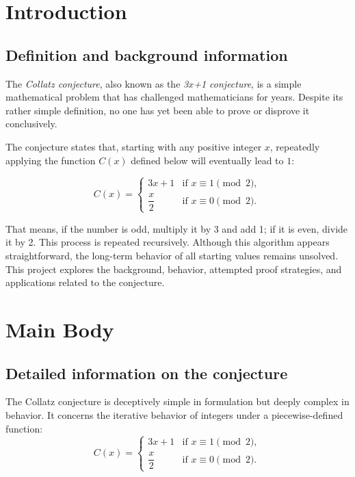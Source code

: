 \documentclass{zc-ust-hw}
\begin{document}
\maketitle
\tableofcontents
\pagebreak
\section{Introduction}
\subsection{Definition and background information}
The \textit{Collatz conjecture}, also known as the \textit{3\( x \)+1 conjecture}, is a simple mathematical problem that has challenged mathematicians for years. Despite its rather simple definition, no one has yet been able to prove or disprove it conclusively.

The conjecture states that, starting with any positive integer \( x \), repeatedly applying the function \( C(x) \) defined below will eventually lead to $1$:

\[
  C(x) =
  \begin{cases}
    3x + 1       & \text{if } x \equiv 1 \pmod{2}, \\
    \dfrac{x}{2} & \text{if } x \equiv 0 \pmod{2}.
  \end{cases}
\]

That means, if the number is odd, multiply it by 3 and add 1; if it is even, divide it by 2. This process is repeated recursively. Although this algorithm appears straightforward, the long-term behavior of all starting values remains unsolved. \\
This project explores the background, behavior, attempted proof strategies, and applications related to the conjecture.
\par\noindent\hrulefill
\section{Main Body}
\subsection{Detailed information on the conjecture}
The Collatz conjecture is deceptively simple in formulation but deeply complex in behavior. It concerns the iterative behavior of integers under a piecewise-defined function:
\[
  C(x) =
  \begin{cases}
    3x + 1       & \text{if } x \equiv 1 \pmod{2}, \\
    \dfrac{x}{2} & \text{if } x \equiv 0 \pmod{2}.
  \end{cases}
\]
\end{document}
